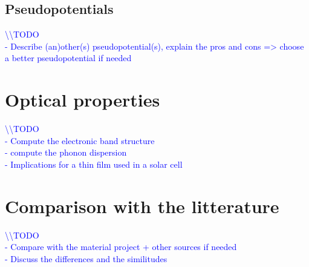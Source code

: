 \documentclass[11pt,a4paper]{article}
\begin{document}
\subsection{Pseudopotentials}
\textcolor{blue}{
\textbackslash\textbackslash TODO\\
- Describe (an)other(s) pseudopotential(s), explain the pros and cons => choose a better pseudopotential if needed}
\newpage
\section{Optical properties}
\textcolor{blue}{
\textbackslash\textbackslash TODO\\
- Compute the electronic band structure\\
- compute the phonon dispersion\\
- Implications for a thin film used in a solar cell}
\newpage
\section{Comparison with the litterature}
\textcolor{blue}{
\textbackslash\textbackslash TODO\\
- Compare with the material project + other sources if needed\\
- Discuss the differences and the similitudes}
\newpage
\end{document}
